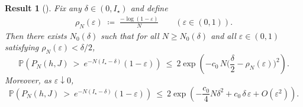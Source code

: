 \documentclass{article}
\newtheorem{theorem}{Result}
\theoremstyle{remark} %
\begin{document}
\begin{theorem}[]\label{thm:hp_upper_P_relaxed_app}
Fix any $\delta\in(0,I_\star)$ and define
\begin{align}
\rho_{N}(\varepsilon)\;\coloneqq\;\frac{-\log(1-\varepsilon)}{N}\qquad(\varepsilon\in(0,1)).
\end{align}
Then there exists $N_0(\delta)$ such that for all $N\ge N_0(\delta)$ and all $\varepsilon\in(0,1)$ satisfying
$\rho_N(\varepsilon)<\delta/2$,
\begin{equation}\label{eq:hp_upper_P_relaxed}
\mathbb P \left(P_N(h,J)\ >\ e^{-N(I_\star-\delta)}(1-\varepsilon)\right)
\ \le\ 2\exp \left(-c_0\,N\Big(\frac{\delta}{2}-\rho_N(\varepsilon)\Big)^2\right).
\end{equation}
Moreover, as $\varepsilon\downarrow 0$,
\begin{equation}\label{eq:hp_upper_P}
\mathbb P \left(P_N(h,J)\ >\ e^{-N(I_\star-\delta)}(1-\varepsilon)\right)
\ \le\ 2\exp \left(-\frac{c_0}{4}N\delta^2
+c_0\,\delta\,\varepsilon
+O \left(\varepsilon^2\right)\right).
\end{equation}
\end{theorem}
\end{document}
